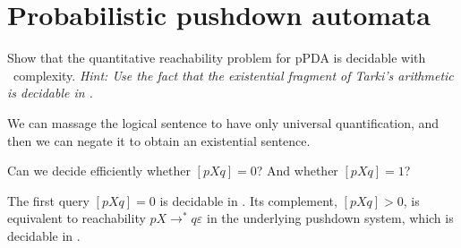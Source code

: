 \section*{Probabilistic pushdown automata}

\begin{exercise}
    Show that the quantitative reachability problem for pPDA is decidable with \PSPACE~complexity.
    \emph{Hint: Use the fact that the existential fragment of Tarki's arithmetic is decidable in \PSPACE.}
\end{exercise}
\begin{solution}
    We can massage the logical sentence to have only universal quantification,
    and then we can negate it to obtain an existential sentence.
\end{solution}

\begin{exercise}
    Can we decide efficiently whether $[pXq] = 0$?
    And whether $[pXq] = 1$?
\end{exercise}
\begin{solution}
    The first query $[pXq] = 0$ is decidable in \PTIME.
    Its complement, $[pXq] > 0$, is equivalent to reachability $pX \to^* q\varepsilon$ in the underlying pushdown system,
    which is decidable in \PTIME.
\end{solution}




